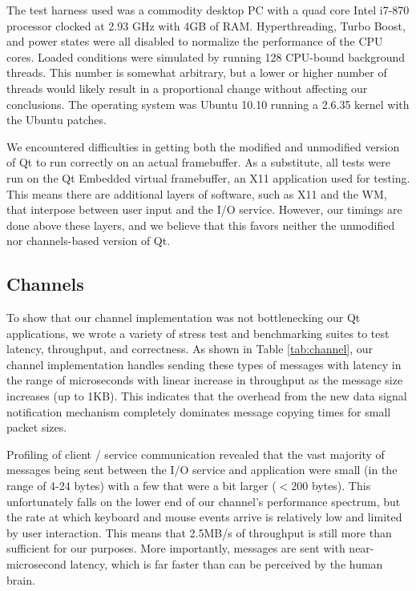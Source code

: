 \documentclass[letterpaper,twocolumn,11pt]{article}
\begin{document}
The test harness used was a commodity desktop PC with a quad core Intel i7-870 processor clocked at 2.93 GHz with 4GB of RAM. Hyperthreading, Turbo Boost, and power states were all disabled to normalize the performance of the CPU cores. Loaded conditions were simulated by running 128 CPU-bound background threads. This number is somewhat arbitrary, but a lower or higher number of threads would likely result in a proportional change without affecting our conclusions. The operating system was Ubuntu 10.10 running a 2.6.35 kernel with the Ubuntu patches.

We encountered difficulties in getting both the modified and unmodified version of Qt to run correctly on an actual framebuffer. As a substitute, all tests were run on the Qt Embedded virtual framebuffer, an X11 application used for testing. This means there are additional layers of software, such as X11 and the WM, that interpose between user input and the I/O service. However, our timings are done above these layers, and we believe that this favors neither the unmodified nor channels-based version of Qt.

\subsection{Channels}

To show that our channel implementation was not bottlenecking our Qt applications, we wrote a variety of stress test and benchmarking suites to test latency, throughput, and correctness. As shown in Table \ref{tab:channel}, our channel implementation handles sending these types of messages with latency in the range of microseconds with linear increase in throughput as the message size increases (up to 1KB). This indicates that the overhead from the new data signal notification mechanism completely dominates message copying times for small packet sizes.

Profiling of client / service communication revealed that the vast majority of messages being sent between the I/O service and application were small (in the range of 4-24 bytes) with a few that were a bit larger ($<$200 bytes). This unfortunately falls on the lower end of our channel's performance spectrum, but the rate at which keyboard and mouse events arrive is relatively low and limited by user interaction. This means that 2.5MB/s of throughput is still more than sufficient for our purposes. More importantly, messages are sent with near-microsecond latency, which is far faster than can be perceived by the human brain.
\end{document}
